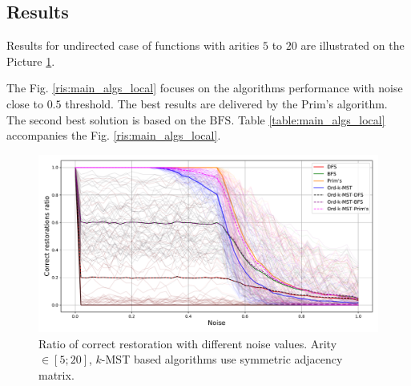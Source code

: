 \documentclass[11pt, tightenlines, twoside, onecolumn, nofloats, nobibnotes, nofootinbib, superscriptaddress, noshowpacks, centertags]{revtex4}
\begin{document}
\subsection{Results}
Results for undirected case of functions with arities $5$ to $20$ are illustrated on the Picture \ref{ris:5_20_arity_uniform_ord}.

The Fig. \ref{ris:main_algs_local} focuses on the algorithms performance with noise close to $0.5$ threshold. The best results are delivered by the Prim's algorithm. The second best solution is based on the $\text{BFS}$. Table \ref{table:main_algs_local} accompanies the Fig. \ref{ris:main_algs_local}.

\begin{figure}
    \centering
    \includegraphics[scale=0.5]{./img/incor_algs_full_alpha006_maxarity_5_20.pdf}
    \caption{Ratio of correct restoration with different noise values. Arity $\in [5; 20]$, $k$-MST based algorithms use symmetric adjacency matrix.}
    \label{ris:5_20_arity_uniform_ord}
\end{figure}
\end{document}

